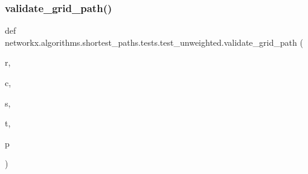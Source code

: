 \subsubsection{\texorpdfstring{validate\+\_\+grid\+\_\+path()}{validate\_grid\_path()}}
{\footnotesize\ttfamily def networkx.\+algorithms.\+shortest\+\_\+paths.\+tests.\+test\+\_\+unweighted.\+validate\+\_\+grid\+\_\+path (\begin{DoxyParamCaption}\item[{}]{r,  }\item[{}]{c,  }\item[{}]{s,  }\item[{}]{t,  }\item[{}]{p }\end{DoxyParamCaption})}

